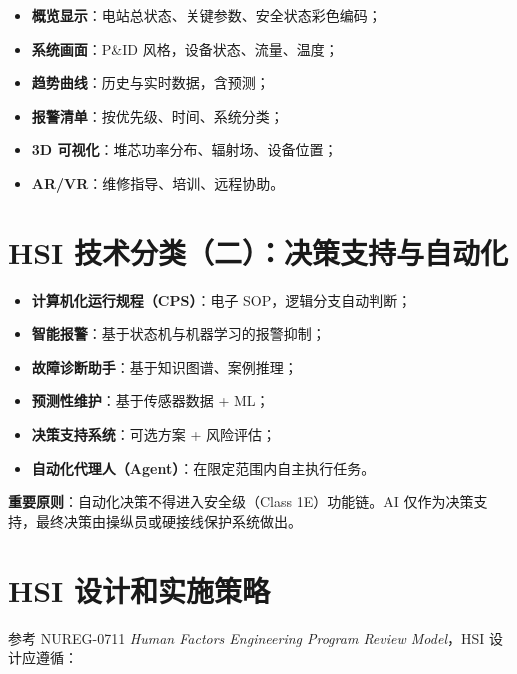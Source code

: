 \documentclass[
  UTF8,
  scheme=plain,
  fontsize=10pt,
  openany
]{ctexbook}
\begin{document}
\begin{itemize}
\tightlist
\item
  \textbf{概览显示}：电站总状态、关键参数、安全状态彩色编码；
\item
  \textbf{系统画面}：P\&ID 风格，设备状态、流量、温度；
\item
  \textbf{趋势曲线}：历史与实时数据，含预测；
\item
  \textbf{报警清单}：按优先级、时间、系统分类；
\item
  \textbf{3D 可视化}：堆芯功率分布、辐射场、设备位置；
\item
  \textbf{AR/VR}：维修指导、培训、远程协助。
\end{itemize}

\section{HSI
技术分类（二）：决策支持与自动化}\label{hsi-ux6280ux672fux5206ux7c7bux4e8cux51b3ux7b56ux652fux6301ux4e0eux81eaux52a8ux5316}

\begin{itemize}
\tightlist
\item
  \textbf{计算机化运行规程（CPS）}：电子 SOP，逻辑分支自动判断；
\item
  \textbf{智能报警}：基于状态机与机器学习的报警抑制；
\item
  \textbf{故障诊断助手}：基于知识图谱、案例推理；
\item
  \textbf{预测性维护}：基于传感器数据 + ML；
\item
  \textbf{决策支持系统}：可选方案 + 风险评估；
\item
  \textbf{自动化代理人（Agent）}：在限定范围内自主执行任务。
\end{itemize}

\begin{epigraph}

\textbf{重要原则}：自动化决策不得进入安全级（Class 1E）功能链。AI
仅作为决策支持，最终决策由操纵员或硬接线保护系统做出。

\end{epigraph}

\section{HSI
设计和实施策略}\label{hsi-ux8bbeux8ba1ux548cux5b9eux65bdux7b56ux7565}

参考 NUREG-0711 \emph{Human Factors Engineering Program Review
Model}，HSI 设计应遵循：
\end{document}
